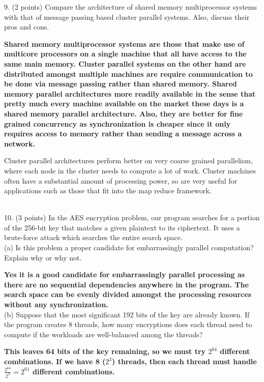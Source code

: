 \documentclass[11pt]{article}
\begin{document}
9. (2 points) Compare the architecture of shared memory multiprocessor systems with that of message passing based cluster parallel systems. Also, discuss their pros and cons.

{\bf
Shared memory multiprocessor systems are those that make use of multicore processors on a single machine that all have access to the same main memory.  Cluster parallel systems on the other hand are distributed amongst multiple machines are require communication to be done via message passing rather than shared memory.  Shared memory parallel architectures more readily available in the sense that pretty much every machine available on the market these days is a shared memory parallel architecture.  Also, they are better for fine grained concurrency as synchronization is cheaper since it only requires access to memory rather than sending a message across a network.  

Cluster parallel architectures perform better on very coarse grained parallelism, where each node in the cluster needs to compute a lot of work.  Cluster machines often have a substantial amount of processing power, so are very useful for applications such as those that fit into the map reduce framework.  
}\\

10. (3 points) In the AES encryption problem, our program searches for a portion of the 256-bit key that matches a given plaintext to its ciphertext. It uses a brute-force attack which searches the entire search space. \\

(a) Is this problem a proper candidate for embarrassingly parallel computation? Explain why or why not.

{\bf Yes it is a good candidate for embarrassingly parallel processing as there are no sequential dependencies anywhere in the program.  The search space can be evenly divided amongst the processing resources without any synchronization.}\\

(b) Suppose that the most significant 192 bits of the key are already known. If the program creates 8 threads, how many encryptions does each thread need to compute if the workloads are well-balanced among the threads?

{\bf
This leaves 64 bits of the key remaining, so we must try $2^{64}$ different combinations.  If we have 8 ($2^3$) threads, then each thread must handle $\frac{2^{64}}{2^3} = 2^{61}$ different combinations.
}\\
\end{document}
